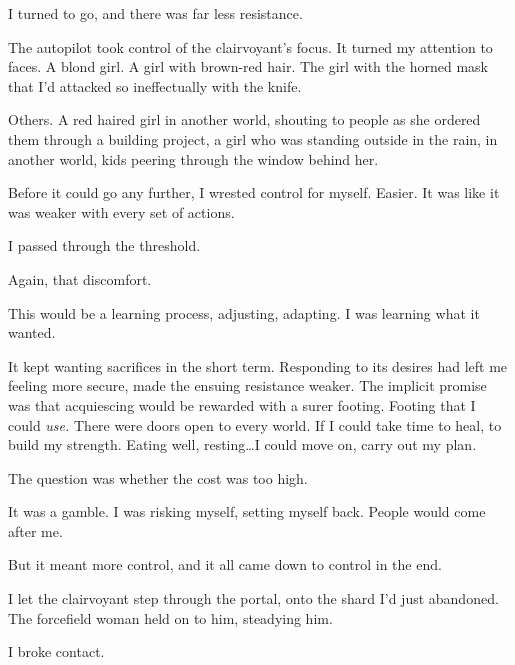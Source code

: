 I turned to go, and there was far less resistance.



The autopilot took control of the clairvoyant's focus.  It turned my attention to faces.  A blond girl.  A girl with brown-red hair.  The girl with the horned mask that I'd attacked so ineffectually with the knife.



Others.  A red haired girl in another world, shouting to people as she ordered them through a building project, a girl who was standing outside in the rain, in another world, kids peering through the window behind her.



Before it could go any further, I wrested control for myself.  Easier.  It was like it was weaker with every set of actions.



I passed through the threshold.



Again, that discomfort.



This would be a learning process, adjusting, adapting.  I was learning what it wanted.



It kept wanting sacrifices in the short term.  Responding to its desires had left me feeling more secure, made the ensuing resistance weaker.  The implicit promise was that acquiescing would be rewarded with a surer footing.  Footing that I could \emph{use.}  There were doors open to every world.  If I could take time to heal, to build my strength.  Eating well, resting\ldots I could move on, carry out my plan.



The question was whether the cost was too high.



It was a gamble.  I was risking myself, setting myself back.  People would come after me.



But it meant more control, and it all came down to control in the end.



I let the clairvoyant step through the portal, onto the shard I'd just abandoned.  The forcefield woman held on to him, steadying him.



I broke contact.



